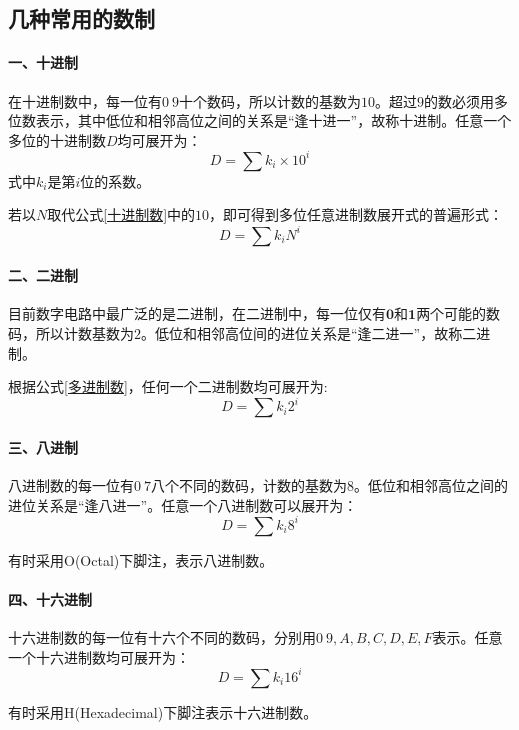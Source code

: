 \subsection{几种常用的数制}

\paragraph{一、十进制}
在十进制数中，每一位有$ 0~9 $十个数码，所以计数的基数为$ 10 $。超过$ 9 $的数必须用多位数表示，其中低位和相邻高位之间的关系是“逢十进一”，故称十进制。任意一个多位的十进制数$ D $均可展开为：
\begin{equation}
    D = \sum k_{i} \times 10^{i}
    \label{十进制数}
\end{equation}
式中$ k_{i} $是第$ i $位的系数。

若以$ N $取代公式\ref{十进制数}中的$ 10 $，即可得到多位任意进制数展开式的普遍形式：
\begin{equation}
    D = \sum k_{i} N^{i}
    \label{多进制数}
\end{equation}

\paragraph{二、二进制}
目前数字电路中最广泛的是二进制，在二进制中，每一位仅有$ \mathbf{0} $和$ \mathbf{1} $两个可能的数码，所以计数基数为$ 2 $。低位和相邻高位间的进位关系是“逢二进一”，故称二进制。

根据公式\ref{多进制数}，任何一个二进制数均可展开为:
\begin{equation}
    D = \sum k_{i}2^{i}
    \label{二进制数}
\end{equation}

\paragraph{三、八进制}
八进制数的每一位有$ 0~7 $八个不同的数码，计数的基数为$ 8 $。低位和相邻高位之间的进位关系是“逢八进一”。任意一个八进制数可以展开为：
\begin{equation}
    D = \sum k_{i}8^{i}
    \label{八进制数}
\end{equation}

有时采用O(Octal)下脚注，表示八进制数。

\paragraph{四、十六进制}

十六进制数的每一位有十六个不同的数码，分别用$ 0~9, A, B, C, D, E, F $表示。任意一个十六进制数均可展开为：
\begin{equation}
    D = \sum k_{i}16^{i}
    \label{十六进制数}
\end{equation}

有时采用H(Hexadecimal)下脚注表示十六进制数。